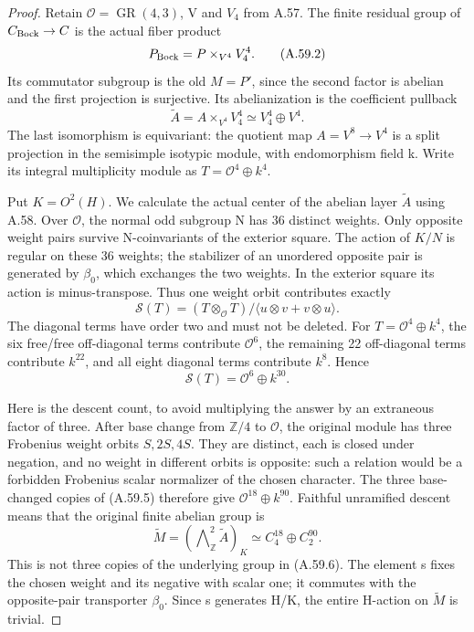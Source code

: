 \begin{proof}
Retain \(\mathcal O=\operatorname{GR}(4,3)\), V and \(V_4\)
from A.57. The finite residual group of \(C_{\rm Bock}\to C\)
is the actual fiber product
\[
 P_{\rm Bock}=P\mathbin{\times}_{V^4}V_4^4.
 \tag{A.59.2}
\]
Its commutator subgroup is the old \(M=P'\), since the second
factor is abelian and the first projection is surjective.
Its abelianization is the coefficient pullback
\[
 \widetilde A=A\mathbin{\times}_{V^4}V_4^4
       \simeq V_4^4\oplus V^4.
 \tag{A.59.3}
\]
The last isomorphism is equivariant: the quotient map
\(A=V^8\to V^4\) is a split projection in the semisimple
isotypic module, with endomorphism field k. Write its integral
multiplicity module as \(T=\mathcal O^4\oplus k^4\).

Put \(K=O^2(H)\). We calculate the actual center of the abelian
layer \(\widetilde A\) using A.58. Over \(\mathcal O\), the
normal odd subgroup N has 36 distinct weights. Only opposite
weight pairs survive N-coinvariants of the exterior square.
The action of \(K/N\) is regular on these 36 weights; the
stabilizer of an unordered opposite pair is generated by
\(\beta_0\), which exchanges the two weights. In the exterior
square its action is minus-transpose. Thus one weight orbit
contributes exactly
\[
 \mathcal S(T)=
 (T\otimes_{\mathcal O}T)\big/
   \langle u\otimes v+v\otimes u\rangle.
 \tag{A.59.4}
\]
The diagonal terms have order two and must not be deleted.
For \(T=\mathcal O^4\oplus k^4\), the six free/free
off-diagonal terms contribute \(\mathcal O^6\), the remaining
22 off-diagonal terms contribute \(k^{22}\), and all eight
diagonal terms contribute \(k^8\). Hence
\[
 \mathcal S(T)=\mathcal O^6\oplus k^{30}.
 \tag{A.59.5}
\]

Here is the descent count, to avoid multiplying the answer by
an extraneous factor of three. After base change from
\(\mathbb Z/4\) to \(\mathcal O\), the original module has
three Frobenius weight orbits \(S,2S,4S\). They are distinct,
each is closed under negation, and no weight in different
orbits is opposite: such a relation would be a forbidden
Frobenius scalar normalizer of the chosen character. The
three base-changed copies of (A.59.5) therefore give
\(\mathcal O^{18}\oplus k^{90}\). Faithful unramified descent
means that the original finite abelian group is
\[
 \widetilde M=
 (\mathop{\bigwedge}\nolimits^2_{\mathbb Z}\widetilde A)_K
       \simeq C_4^{18}\oplus C_2^{90}.
 \tag{A.59.6}
\]
This is not three copies of the underlying group in
(A.59.6). The element s fixes the chosen weight and its
negative with scalar one; it commutes with the opposite-pair
transporter \(\beta_0\). Since s generates H/K, the entire
H-action on \(\widetilde M\) is trivial.


\end{proof}
